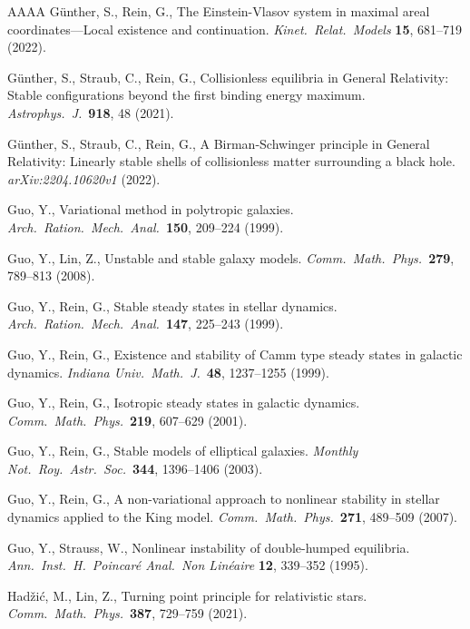\documentclass[11pt]{article}
\begin{document}
\begin{thebibliography}{AAAA}
  {\sc G\"unther, S., Rein, G.},
  The Einstein-Vlasov system in maximal areal coord\-inates---Local existence
  and continuation.
  {\em  Kinet.\ Relat.\ Models} 
  {\bf 15}, 681--719 (2022).
	
  {\sc G\"unther, S., Straub, C., Rein, G.},
  Collisionless equilibria in General Relativity:
  Stable configurations beyond the first binding energy maximum.
  {\em Astrophys.\ J.}\
  {\bf 918}, 48 (2021).
     
  {\sc G\"unther, S., Straub, C., Rein, G.}, 
  A Birman-Schwinger principle in General Relativity: Linearly stable shells
  of collisionless matter surrounding a black hole.
  {\em arXiv:2204.10620v1}  (2022).

  {\sc Guo, Y.},
  Variational method in polytropic galaxies.
  {\em Arch.\ Ration.\ Mech.\ Anal.}\ 
  {\bf 150}, 209--224 (1999).

  {\sc Guo, Y., Lin, Z.},
  Unstable and stable galaxy models.
  {\em Comm.\ Math.\ Phys.}\ 
  {\bf 279}, 789--813 (2008).
  
  {\sc Guo, Y., Rein, G.},
  Stable steady states in stellar dynamics.
  {\em Arch.\ Ration.\ Mech.\ Anal.}\ 
  {\bf 147}, 225--243 (1999).

\bibitem{GuRe99b} %
  {\sc Guo, Y., Rein, G.},
  Existence and stability of Camm type steady states in galactic dynamics.
  {\em Indiana Univ.\ Math.\ J.}\ 
  {\bf 48}, 1237--1255 (1999).

\bibitem{GuRe2001} %
  {\sc Guo, Y., Rein, G.},
  Isotropic steady states in galactic dynamics.
  {\em Comm.\ Math.\ Phys.}\ 
  {\bf 219}, 607--629 (2001).

\bibitem{GuRe03} %
  {\sc Guo, Y., Rein, G.},
  Stable models of elliptical galaxies. 
  {\em Monthly Not.\ Roy.\ Astr.\ Soc.}\ 
  {\bf 344}, 1396--1406 (2003).
  
  {\sc Guo, Y., Rein, G.},
  A non-variational approach to nonlinear stability in stellar dynamics
  applied to the King model.
  {\em Comm.\ Math.\ Phys.}\ 
  {\bf 271}, 489--509 (2007).
    
  {\sc Guo, Y., Strauss, W.},
  Nonlinear instability of double-humped equilibria.
  {\em Ann.\ Inst.\ H.\ Poincar\'e Anal.\ Non Lin\'eaire}
  {\bf 12}, 339--352 (1995).

\bibitem{HaLin} %
  {\sc Had\v zi\'c, M., Lin, Z.},
  Turning point principle for relativistic stars.
  {\em Comm.\ Math.\ Phys.}\ 
  {\bf 387}, 729--759 (2021).


\end{thebibliography}
\end{document}
